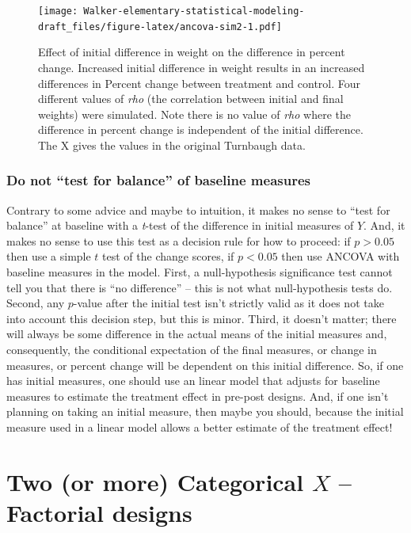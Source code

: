 \documentclass[]{book}
\begin{document}
\begin{figure}
\centering
\texttt{[image: Walker-elementary-statistical-modeling-draft\_files/figure-latex/ancova-sim2-1.pdf]}
\caption{\label{fig:ancova-sim2}Effect of initial difference in weight on
the difference in percent change. Increased initial difference in weight
results in an increased differences in Percent change between treatment
and control. Four different values of \emph{rho} (the correlation
between initial and final weights) were simulated. Note there is no
value of \emph{rho} where the difference in percent change is
independent of the initial difference. The X gives the values in the
original Turnbaugh data.}
\end{figure}

\subsection{\texorpdfstring{Do not ``test for balance'' of baseline
measures}{Do not test for balance of baseline measures}}\label{do-not-test-for-balance-of-baseline-measures}

Contrary to some advice and maybe to intuition, it makes no sense to
``test for balance'' at baseline with a \emph{t}-test of the difference
in initial measures of \(Y\). And, it makes no sense to use this test as
a decision rule for how to proceed: if \(p>0.05\) then use a simple
\(t\) test of the change scores, if \(p<0.05\) then use ANCOVA with
baseline measures in the model. First, a null-hypothesis significance
test cannot tell you that there is ``no difference'' -- this is not what
null-hypothesis tests do. Second, any \(p\)-value after the initial test
isn't strictly valid as it does not take into account this decision
step, but this is minor. Third, it doesn't matter; there will always be
some difference in the actual means of the initial measures and,
consequently, the conditional expectation of the final measures, or
change in measures, or percent change will be dependent on this initial
difference. So, if one has initial measures, one should use an linear
model that adjusts for baseline measures to estimate the treatment
effect in pre-post designs. And, if one isn't planning on taking an
initial measure, then maybe you should, because the initial measure used
in a linear model allows a better estimate of the treatment effect!

\chapter{\texorpdfstring{Two (or more) Categorical \(X\) -- Factorial
designs}{Two (or more) Categorical X -- Factorial designs}}\label{two-or-more-categorical-x-factorial-designs}
\end{document}
